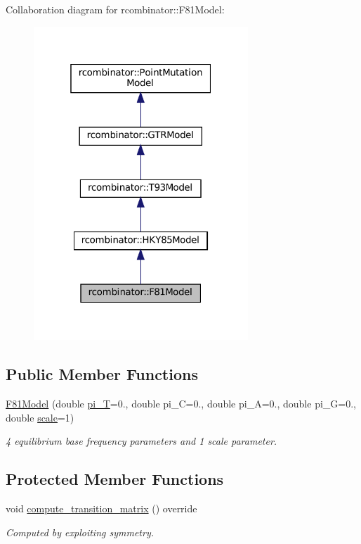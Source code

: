 Collaboration diagram for rcombinator\+:\+:F81\+Model\+:\nopagebreak
\begin{figure}[H]
\begin{center}
\leavevmode
\includegraphics[width=229pt]{classrcombinator_1_1F81Model__coll__graph}
\end{center}
\end{figure}
\subsection*{Public Member Functions}
\begin{DoxyCompactItemize}
\item 
\mbox{\hyperlink{classrcombinator_1_1F81Model_a80c3357497cdc6b91ff4c408750b47bb}{F81\+Model}} (double \mbox{\hyperlink{classrcombinator_1_1GTRModel_a1f58fe556a5ce9aaba6168c9f91e8372}{pi\+\_\+T}}=0., double pi\+\_\+C=0., double pi\+\_\+A=0., double pi\+\_\+G=0., double \mbox{\hyperlink{classrcombinator_1_1PointMutationModel_a328a30a438bb1b6a625faa3f714a85c8}{scale}}=1)
\begin{DoxyCompactList}\small\item\em 4 equilibrium base frequency parameters and 1 scale parameter. \end{DoxyCompactList}\end{DoxyCompactItemize}
\subsection*{Protected Member Functions}
\begin{DoxyCompactItemize}
\item 
\mbox{\label{classrcombinator_1_1F81Model_a5bb9c63e55c4f8f7b9573281ff6ee610}} 
void \mbox{\hyperlink{classrcombinator_1_1F81Model_a5bb9c63e55c4f8f7b9573281ff6ee610}{compute\+\_\+transition\+\_\+matrix}} () override
\begin{DoxyCompactList}\small\item\em Computed by exploiting symmetry. \end{DoxyCompactList}\end{DoxyCompactItemize}
